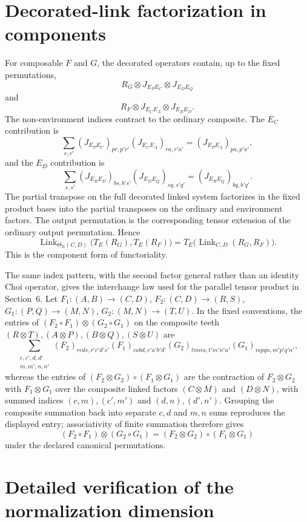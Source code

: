 \documentclass[11pt,a4paper]{article}
\theoremstyle{definition}
\theoremstyle{plain}
\theoremstyle{remark}
\begin{document}
\section{Decorated-link factorization in components}
\label{app:decorated-factorization}

For composable $F$ and $G$, the decorated operators contain, up to the
fixed permutations,
\[
R_G\otimes J_{E_PE_C}\otimes J_{E_DE_Q}
\]
and
\[
R_F\otimes J_{E_CE_A}\otimes J_{E_BE_D}.
\]
The non-environment indices contract to the ordinary composite. The
$E_C$ contribution is
\[
\sum_{r,r'}
(J_{E_PE_C})_{pr,p'r'}
(J_{E_CE_A})_{ra,r'a'}
=(J_{E_PE_A})_{pa,p'a'},
\]
and the $E_D$ contribution is
\[
\sum_{s,s'}
(J_{E_BE_D})_{bs,b's'}
(J_{E_DE_Q})_{sq,s'q'}
=(J_{E_BE_Q})_{bq,b'q'}.
\]
The partial transpose on the full decorated linked system factorizes in
the fixed product bases into the partial transposes on the ordinary and
environment factors. The output permutation is the corresponding tensor
extension of the ordinary output permutation. Hence
\[
\operatorname{Link}_{\Theta_E(C,D)}
\bigl(T_E(R_G),T_E(R_F)\bigr)
=
T_E\bigl(\operatorname{Link}_{C,D}(R_G,R_F)\bigr).
\]
This is the component form of functoriality.

The same index pattern, with the second factor general rather than an
identity Choi operator, gives the interchange law used for the parallel
tensor product in Section~6. Let $F_1:(A,B)\to(C,D)$,
$F_2:(C,D)\to(R,S)$, $G_1:(P,Q)\to(M,N)$, $G_2:(M,N)\to(T,U)$. In the
fixed conventions, the entries of $(F_2\circ F_1)\otimes(G_2\circ G_1)$
on the composite teeth $(R\otimes T),(A\otimes P),(B\otimes
Q),(S\otimes U)$ are
\[
\sum_{\substack{c,c',d,d'\\m,m',n,n'}}
(F_2)_{rcds,r'c'd's'}(F_1)_{cabd,c'a'b'd'}
(G_2)_{tmnu,t'm'n'u'}(G_1)_{mpqn,m'p'q'n'},
\]
whereas the entries of $(F_2\otimes G_2)\circ(F_1\otimes G_1)$ are the
contraction of $F_2\otimes G_2$ with $F_1\otimes G_1$ over the
composite linked factors $(C\otimes M)$ and $(D\otimes N)$, with summed
indices $(c,m),(c',m')$ and $(d,n),(d',n')$. Grouping the composite
summation back into separate $c,d$ and $m,n$ sums reproduces the
displayed entry; associativity of finite summation therefore gives
\[
(F_2\circ F_1)\otimes(G_2\circ G_1)
=
(F_2\otimes G_2)\circ(F_1\otimes G_1)
\]
under the declared canonical permutations.

\section{Detailed verification of the normalization dimension}
\label{app:dimension}
\end{document}
